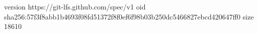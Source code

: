version https://git-lfs.github.com/spec/v1
oid sha256:57f3f8abb1b4693f08fd51372f8f0ef6f98b03b250dc5466827ebcd420647ff0
size 18610
